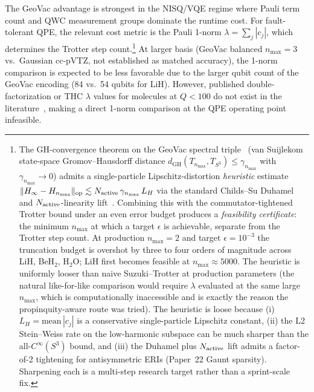 \documentclass[twocolumn,pra,amsmath,amssymb,superscriptaddress]{revtex4-2}
\begin{document}
The GeoVac advantage is strongest in the NISQ/VQE regime where Pauli
term count and QWC measurement groups dominate the runtime cost.
For fault-tolerant QPE, the relevant cost metric is the Pauli 1-norm
$\lambda = \sum_j |c_j|$, which determines the Trotter step
count.\footnote{%
The GH-convergence theorem on the GeoVac spectral
triple~\cite{GeoVac_Paper38} (van Suijlekom state-space Gromov--Hausdorff
distance $d_{\mathrm{GH}}(T_{n_{\max}}, T_{S^3}) \le \gamma_{n_{\max}}$ with
$\gamma_{n_{\max}} \to 0$) admits a single-particle
Lipschitz-distortion \emph{heuristic} estimate
$\|H_\infty - H_{n_{\max}}\|_{\rm op}
\lesssim N_{\rm active}\,\gamma_{n_{\max}}\,L_H$ via the standard
Childs--Su Duhamel and $N_{\rm active}$-linearity
lift~\cite{Childs2021}.  Combining this with the commutator-tightened
Trotter bound under an even error budget produces a
\emph{feasibility certificate}: the minimum $n_{\max}$ at which a
target $\epsilon$ is achievable, separate from the Trotter step
count.  At production $n_{\max} = 2$ and target $\epsilon = 10^{-3}$
the truncation budget is overshot by three to four orders of
magnitude across LiH, BeH$_2$, H$_2$O; LiH first becomes feasible at
$n_{\max} \approx 5000$.  The heuristic is uniformly looser than
naive Suzuki--Trotter at production parameters (the natural
like-for-like comparison would require $\lambda$ evaluated at the
same large $n_{\max}$, which is computationally inaccessible and is
exactly the reason the propinquity-aware route was tried).  The
heuristic is loose because (i) $L_H = \mathrm{mean}\,|c_j|$ is a
conservative single-particle Lipschitz constant, (ii) the L2
Stein--Weiss rate on the low-harmonic subspace can be much sharper
than the all-$C^\infty(S^3)$ bound, and (iii) the Duhamel plus
$N_{\rm active}$ lift admits a factor-of-2 tightening for
antisymmetric ERIs (Paper~22 Gaunt sparsity).  Sharpening each
is a multi-step research target rather than a sprint-scale fix.}
At larger basis (GeoVac balanced $n_{\max}=3$ vs.\ Gaussian
cc-pVTZ, not established as matched accuracy), the 1-norm comparison
is expected to be less favorable due to the larger
qubit count of the GeoVac encoding (84 vs.\ 54 qubits for LiH).
However, published double-factorization or THC $\lambda$ values for
molecules at $Q < 100$ do not exist in the literature~\cite{Lee2021,
vonBurg2021}, making a direct 1-norm comparison at the QPE operating
point infeasible.

\end{document}
